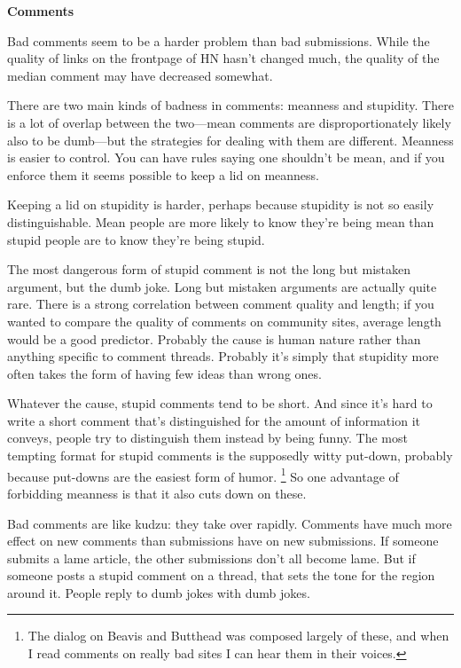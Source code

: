 \textbf{Comments}

Bad comments seem to be a harder problem than bad submissions. While the
quality of links on the frontpage of HN hasn't changed much, the quality
of the median comment may have decreased somewhat.

There are two main kinds of badness in comments: meanness and stupidity.
There is a lot of overlap between the two---mean comments are
disproportionately likely also to be dumb---but the strategies for
dealing with them are different. Meanness is easier to control. You can
have rules saying one shouldn't be mean, and if you enforce them it
seems possible to keep a lid on meanness.

Keeping a lid on stupidity is harder, perhaps because stupidity is not
so easily distinguishable. Mean people are more likely to know they're
being mean than stupid people are to know they're being stupid.

The most dangerous form of stupid comment is not the long but mistaken
argument, but the dumb joke. Long but mistaken arguments are actually
quite rare. There is a strong correlation between comment quality and
length; if you wanted to compare the quality of comments on community
sites, average length would be a good predictor. Probably the cause is
human nature rather than anything specific to comment threads. Probably
it's simply that stupidity more often takes the form of having few ideas
than wrong ones.

Whatever the cause, stupid comments tend to be short. And since it's
hard to write a short comment that's distinguished for the amount of
information it conveys, people try to distinguish them instead by being
funny. The most tempting format for stupid comments is the supposedly
witty put-down, probably because put-downs are the easiest form of
humor. \footnote{The dialog on Beavis and Butthead was composed largely of these,
and when I read comments on really bad sites I can hear them in their
voices.} So one advantage of forbidding meanness
is that it also cuts down on these.

Bad comments are like kudzu: they take over rapidly. Comments have much
more effect on new comments than submissions have on new submissions. If
someone submits a lame article, the other submissions don't all become
lame. But if someone posts a stupid comment on a thread, that sets the
tone for the region around it. People reply to dumb jokes with dumb
jokes.

